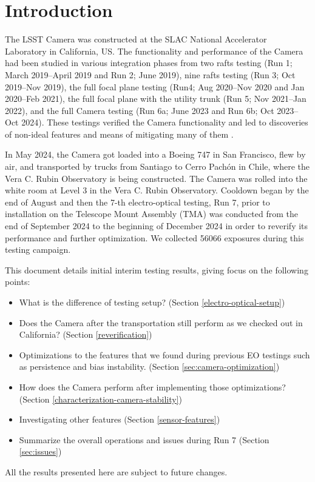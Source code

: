 \section{Introduction}
The LSST Camera was constructed at the SLAC National Accelerator Laboratory in California, US.
The functionality and performance of the Camera had been studied in various integration phases from two rafts testing (Run 1; March 2019--April 2019 and Run 2; June 2019), nine rafts testing (Run 3; Oct 2019--Nov 2019), the full focal plane testing (Run4; Aug 2020--Nov 2020 and Jan 2020--Feb 2021), the full focal plane with the utility trunk (Run 5; Nov 2021--Jan 2022), and the full Camera testing (Run 6a; June 2023 and Run 6b; Oct 2023--Oct 2024). These testings verified the Camera functionality and led to discoveries of non-ideal features and means of mitigating many of them \citep{2024SPIE13096E..1SR}.

In May 2024, the Camera got loaded into a Boeing 747 in San Francisco, flew by air, and transported by trucks from Santiago to Cerro Pachón in Chile, where the Vera C. Rubin Observatory is being constructed. The Camera was rolled into the white room at Level 3 in the Vera C. Rubin Observatory. Cooldown began by the end of August and then the 7-th electro-optical testing, Run 7, prior to installation on the Telescope Mount Assembly (TMA) was conducted from the end of September 2024 to the beginning of December 2024 in order to reverify its performance and further optimization. We collected 56066 exposures during this testing campaign.

This document details initial interim testing results, giving focus on the following points:
\begin{itemize}
    \item What is the difference of testing setup? (Section \ref{electro-optical-setup})
    \item Does the Camera after the transportation still perform as we checked out in California? (Section \ref{reverification})
    \item Optimizations to the features that we found during previous EO testings such as persistence and bias instability. (Section \ref{sec:camera-optimization})
    \item How does the Camera perform after implementing those optimizations? (Section \ref{characterization-camera-stability})
    \item Investigating other features (Section \ref{sensor-features})
    \item Summarize the overall operations and issues during Run 7 (Section \ref{sec:issues})
\end{itemize}
All the results presented here are subject to future changes.

